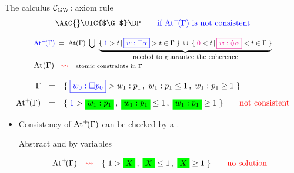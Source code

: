 \begin{frame}{The calculus $\mathcal{C}_{\mathrm{GW}}$: axiom rule}
  \small
  \[
    \AXC{}
    \RightLabel{\small$\ruleAxat$}
    \UIC{$\G$}    
    \DP\qquad\mbox{\tb{if $\Atmp{\G}$ is not consistent}}
 \]
  
 \[
   \begin{array}{l}
    \mbox{\medfont $\tb{\Atmp{\G}}\;=\;\Atm{\G}\;\bigcup\;
      \underbrace{ %
        \{\;\tb{1} > t\,|\,\tb{\fbox{$w : \Box \a$}} > t \in \G\;\}
        \;\cup\;
        \{\;\tm{0} < t\,|\,\tm{\fbox{$w : \Diam \a$}} < t \in \G\;\}
     }_{\mbox{needed to guarantee the coherence}}$}
     \\[2ex]
\scriptsize     \Atm{\G}\quad {\red \rightsquigarrow} \quad \text{atomic constraints in $\G$}
   \end{array}  
   \]




\SP
  \[
    \begin{array}{rcl}
      \G &=&\{\;\tb{\fbox{$w_0 : \Box p_0$}} > w_1:p_1\,,\; w_1:p_1 \leq 1\,,\; w_1:p_1 \geq 1\;\}
   \\[2ex]          
      \Atmp{\G}& =  & \{\;\tb{1} > \ggbox{$w_1:p_1$}\,,\;\ggbox{$w_1:  p_1$} \leq 1\,,\; \ggbox{$w_1:p_1$} \geq 1\;\}
\qquad\text{\red not consistent}
    \end{array}
  \]
 


  \MP

  \begin{itemize}
  \item 
  
 Consistency of $\mathrm{At}^{+}\!(\Gamma)$  can be checked by a .

\medskip

\begin{center}
 \begin{minipage}{23em}
\begin{tcgreenbox}[top=0ex]{}\medfont
\center
  Abstract   and    by variables
\end{tcgreenbox}
\end{minipage}
\end{center}

\medskip
\[
    \Atmp{\G} \quad\tr{\leadsto}\quad   \{\;{1} > \ggbox{$X$}\,,\;\ggbox{$X$} \leq 1\,,\; \ggbox{$X$} \geq 1\;\}
\qquad\text{\tr{no solution}}
  \]
\end{itemize}



  \VFILL
\end{frame}



